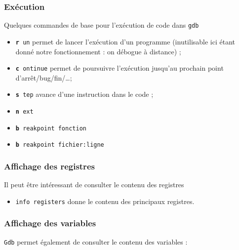 %
\subsubsection{Exécution}

   Quelques commandes de base pour l'exécution de code dans {\tt gdb}

\begin{itemize}
     \item {\tt {\bf r} un} permet de lancer l'exécution d'un
       programme (inutilisable ici étant donné notre fonctionnement :
       on débogue à distance) ;
     \item {\tt {\bf c} ontinue} permet de poursuivre l'exécution jusqu'au
       prochain point d'arrêt/bug/fin/\ldots ;
     \item {\tt {\bf s} tep} avance d'une instruction dans le code ;
     \item {\tt {\bf n} ext}
     \item {\tt {\bf b} reakpoint fonction}
     \item {\tt {\bf b} reakpoint fichier:ligne}
\end{itemize}

%
\subsubsection{Affichage des registres}

   Il peut être intéressant de consulter le contenu des registres

\begin{itemize}
     \item {\tt info registers} donne le contenu des principaux registres.
\end{itemize}

%
\subsubsection{Affichage des variables}

   {\tt Gdb} permet également de consulter le contenu des variables :

